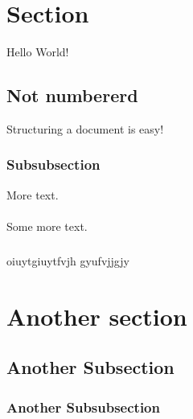 \documentclass{article}
\begin{document}
\section{Section}
Hello World!
\subsection*{Not numbererd}
Structuring a document is easy!
\subsubsection{Subsubsection}
More text.
\paragraph{}
Some more text.
\subparagraph{}
oiuytgiuytfvjh gyufvjjgjy

\subparagraph{}
\lipsum[1]
\section{Another section}
\subsection{Another Subsection}
\subsubsection{Another Subsubsection}
\lipsum[1-3]
\end{document}
